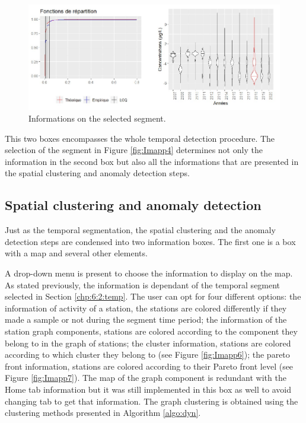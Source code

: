 \begin{figure}[ht]
  \centering
  \includegraphics[]{figs/Chap6/Im_app5.pdf}
  \caption{Informations on the selected segment.}
  \label{fig:Imapp5}
\end{figure}

This two boxes encompasses the whole temporal detection procedure. The selection of the segment in Figure \ref{fig:Imapp4} determines not only the information in the second box but also all the informations that are presented in the spatial clustering and anomaly detection steps.

\subsection{Spatial clustering and anomaly detection}

Just as the temporal segmentation, the spatial clustering and the anomaly detection steps are condensed into two information boxes. The first one is a box with a map and several other elements. 

A drop-down menu is present to choose the information to display on the map. As stated previously, the information is dependant of the temporal segment selected in Section \ref{chp:6:2:temp}. The user can opt for four different options: the information of activity of a station, the stations are colored differently if they made a sample or not during the segment time period; the information of the station graph components, stations are colored according to the component they belong to in the graph of stations; the cluster information, stations are colored according to which cluster they belong to (see Figure \ref{fig:Imapp6}); the pareto front information, stations are colored according to their Pareto front level (see Figure \ref{fig:Imapp7}). The map of the graph component is redundant with the Home tab information but it was still implemented in this box as well to avoid changing tab to get that information. The graph clustering is obtained using the clustering methods presented in Algorithm \ref{algo:dyn}.  
   
